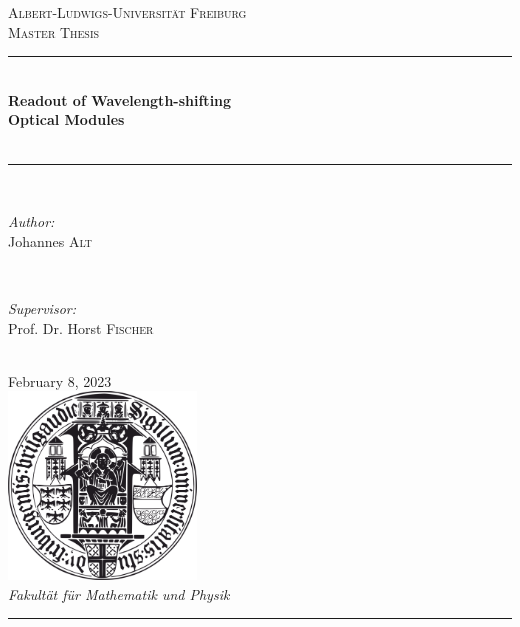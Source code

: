 \begin{titlepage}
\newcommand{\HRule}{\rule{\linewidth}{0.25mm}} %
\center
\textsc{\LARGE Albert-Ludwigs-Universit\"{a}t Freiburg}\\[1.5cm]
\textsc{\Large Master Thesis}\\[0.4cm]
\HRule \\[0.4cm]
{\huge \bfseries Readout of Wavelength-shifting} \\[0.2cm] 
{\huge \bfseries Optical Modules} \\[0.2cm]
\\[0.2cm]
\HRule \\[1.5cm]

\begin{minipage}{0.4\textwidth}
\begin{flushleft} \large
\emph{Author:}\\
Johannes \textsc{Alt} \\
\end{flushleft}
\end{minipage}
~
\begin{minipage}{0.4\textwidth}
\begin{flushright} \large
\emph{Supervisor:} \\
Prof. Dr. Horst \textsc{Fischer} \\
\end{flushright}
\end{minipage}\\[2cm]

{\large February 8, 2023}\\[1cm]

\includegraphics[width=5cm, keepaspectratio]{pictures/siegel.png}\\[1cm]

\large \emph{Fakult\"{a}t f\"{u}r Mathematik und Physik}\\[0.4cm]

\HRule \\
\setcounter{page}{0}
\end{titlepage}
